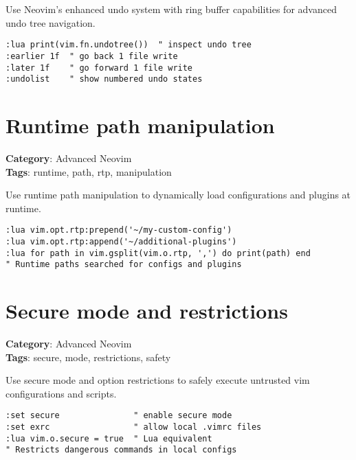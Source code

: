 Use Neovim's enhanced undo system with ring buffer capabilities for advanced undo tree navigation.

\begin{Exa*}{}
\begin{Verbatim}[fontsize=\footnotesize, breaklines, breakanywhere]
:lua print(vim.fn.undotree())  " inspect undo tree
:earlier 1f  " go back 1 file write
:later 1f    " go forward 1 file write  
:undolist    " show numbered undo states
\end{Verbatim}
\end{Exa*}

\section{Runtime path manipulation}

\textbf{Category}: Advanced Neovim\\ \textbf{Tags}: runtime, path, rtp, manipulation
\vspace{0.5cm}

Use runtime path manipulation to dynamically load configurations and plugins at runtime.

\begin{Exa*}{}
\begin{Verbatim}[fontsize=\footnotesize, breaklines, breakanywhere]
:lua vim.opt.rtp:prepend('~/my-custom-config')
:lua vim.opt.rtp:append('~/additional-plugins')  
:lua for path in vim.gsplit(vim.o.rtp, ',') do print(path) end
" Runtime paths searched for configs and plugins
\end{Verbatim}
\end{Exa*}

\section{Secure mode and restrictions}

\textbf{Category}: Advanced Neovim\\ \textbf{Tags}: secure, mode, restrictions, safety
\vspace{0.5cm}

Use secure mode and option restrictions to safely execute untrusted vim configurations and scripts.

\begin{Exa*}{}
\begin{Verbatim}[fontsize=\footnotesize, breaklines, breakanywhere]
:set secure               " enable secure mode
:set exrc                 " allow local .vimrc files
:lua vim.o.secure = true  " Lua equivalent
" Restricts dangerous commands in local configs
\end{Verbatim}
\end{Exa*}

